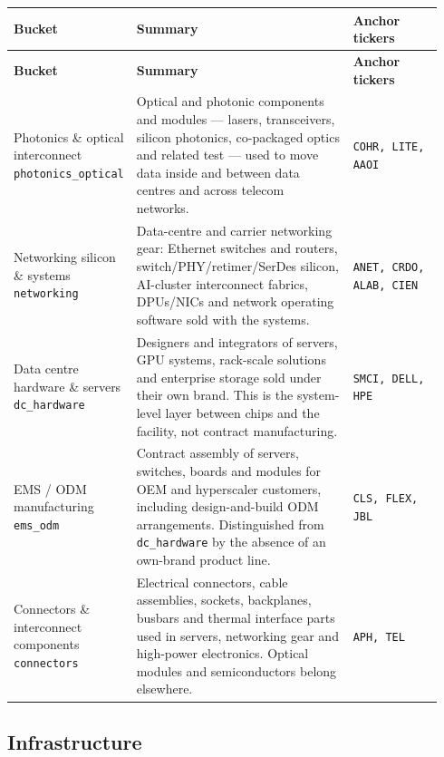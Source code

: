 \documentclass[11pt,a4paper,oneside]{article}
\begin{document}
\begin{longtable}{@{}p{0.20\linewidth} p{0.52\linewidth} p{0.22\linewidth}@{}}
\toprule
\textbf{Bucket} & \textbf{Summary} & \textbf{Anchor tickers} \\
\midrule
\endfirsthead
\toprule
\textbf{Bucket} & \textbf{Summary} & \textbf{Anchor tickers} \\
\midrule
\endhead
\bottomrule
\endfoot
Photonics \& optical interconnect \newline \texttt{photonics\_optical} & Optical and photonic components and modules --- lasers, transceivers, silicon photonics, co-packaged optics and related test --- used to move data inside and between data centres and across telecom networks. & \texttt{COHR, LITE, AAOI} \\
\addlinespace
Networking silicon \& systems \newline \texttt{networking} & Data-centre and carrier networking gear: Ethernet switches and routers, switch/PHY/retimer/SerDes silicon, AI-cluster interconnect fabrics, DPUs/NICs and network operating software sold with the systems. & \texttt{ANET, CRDO, ALAB, CIEN} \\
\addlinespace
Data centre hardware \& servers \newline \texttt{dc\_hardware} & Designers and integrators of servers, GPU systems, rack-scale solutions and enterprise storage sold under their own brand. This is the system-level layer between chips and the facility, not contract manufacturing. & \texttt{SMCI, DELL, HPE} \\
\addlinespace
EMS / ODM manufacturing \newline \texttt{ems\_odm} & Contract assembly of servers, switches, boards and modules for OEM and hyperscaler customers, including design-and-build ODM arrangements. Distinguished from \texttt{dc\_hardware} by the absence of an own-brand product line. & \texttt{CLS, FLEX, JBL} \\
\addlinespace
Connectors \& interconnect components \newline \texttt{connectors} & Electrical connectors, cable assemblies, sockets, backplanes, busbars and thermal interface parts used in servers, networking gear and high-power electronics. Optical modules and semiconductors belong elsewhere. & \texttt{APH, TEL} \\
\end{longtable}

\subsection*{Infrastructure}
\end{document}
